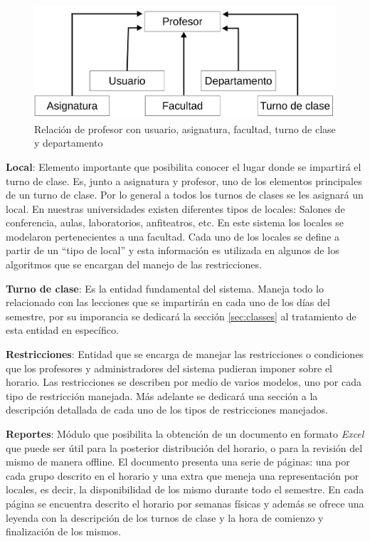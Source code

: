\begin{figure}[h!]
	\centering
	\includegraphics[width=0.75\linewidth]{images/Chapter 2/teacher_relation}
	\caption{Relación de profesor con usuario, asignatura, facultad, turno de clase y departamento }
	\label{fig:teacher_relation}
\end{figure}

\textbf{Local}: Elemento importante que posibilita conocer el lugar donde se impartirá el turno de clase. Es, junto a asignatura y profesor, uno de los elementos principales de un turno de clase. Por lo general a todos los turnos de clases se les
asignará un local. En nuestras universidades existen diferentes tipos de locales: Salones de conferencia,
aulas, laboratorios, anfiteatros, etc. En este sistema los locales se modelaron pertenecientes a una facultad.
Cada uno de los locales se define a partir de un “tipo de local” y esta información es utilizada en algunos de
los algoritmos que se encargan del manejo de las restricciones.

\textbf{Turno de clase}: Es la entidad fundamental del sistema. Maneja todo lo relacionado con las lecciones que se impartirán en cada uno de los días del semestre, por su imporancia se dedicará la sección \ref{sec:classes} al tratamiento de esta entidad en específico.

\textbf{Restricciones}: Entidad que se encarga de manejar las restricciones o condiciones que los profesores y administradores del sistema pudieran imponer sobre el horario. Las restricciones se describen por medio de varios modelos, uno por cada tipo de restricción manejada. Más adelante se dedicará una sección a la descripción detallada de cada uno de los tipos de restricciones manejados.

\textbf{Reportes}: Módulo que posibilita la obtención de un documento en formato \textit{Excel} que puede ser útil para la posterior distribución del horario, o para la revisión del mismo de manera offline. El documento presenta una serie de páginas: una por cada grupo descrito en el horario y una extra que meneja una representación por locales, es decir, la disponibilidad de los mismo durante todo el semestre. En cada página se encuentra descrito el horario por semanas físicas y además se ofrece una leyenda con la descripción de los turnos de clase y la hora de comienzo y finalización de los mismos.\\\\


